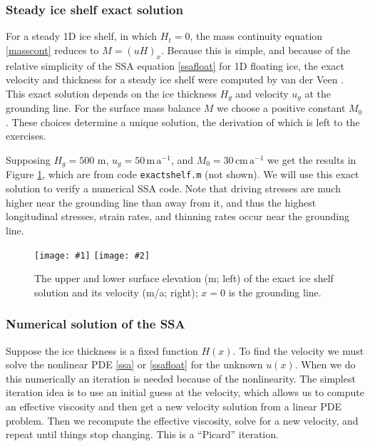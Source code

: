 \documentclass[titlepage,a4paper,final,12pt]{scrartcl}
\newcommand{\twofigsizes}[5]{
\begin{figure}[ht]
\centering
\texttt{[image: \#1]} \quad
\texttt{[image: \#2]}
\caption{#3}
\label{fig:#1}
\end{figure}}
\newcommand{\twofig}[3]{\twofigsizes{#1}{#2}{#3}{2.5in}{2.5in}}
\begin{document}
\subsubsection*{Steady ice shelf exact solution}  For a steady 1D ice shelf, in which $H_t=0$, the mass continuity equation \eqref{masscont} reduces to $M=(uH)_x$.  Because this is simple, and because of the relative simplicity of the SSA equation \eqref{ssafloat} for 1D floating ice, the exact velocity and thickness for a steady ice shelf were computed by van der Veen  \cite{vanderVeen83}.  This exact solution depends on the ice thickness $H_g$ and velocity $u_g$ at the grounding line.  For the surface mass balance $M$ we choose a positive constant $M_0$.  These choices determine a unique solution, the derivation of which is left to the exercises.

Supposing $H_g=500$ m, $u_g = 50 \,\text{m}\,\text{a}^{-1}$, and $M_0=30 \,\text{cm}\,\text{a}^{-1}$ we get the results in Figure \ref{fig:steadyshelfprofile}, which are from code \texttt{exactshelf.m} (not shown).  We will use this exact solution to verify a numerical SSA code.  Note that driving stresses are much higher near the grounding line than away from it, and thus the highest longitudinal stresses, strain rates, and thinning rates occur near the grounding line.

\twofig{steadyshelfprofile}{steadyshelfvelocity}{The upper and lower surface elevation (m; left) of the exact ice shelf solution and its velocity (m/a; right); $x=0$ is the grounding line.}

\subsubsection*{Numerical solution of the SSA}  Suppose the ice thickness is a fixed function $H(x)$.  To find the velocity we must solve the nonlinear PDE \eqref{ssa} or \eqref{ssafloat} for the unknown $u(x)$.  When we do this numerically an iteration is needed because of the nonlinearity.  The simplest iteration idea is to use an initial guess at the velocity, which allows us to compute an effective viscosity and then get a new velocity solution from a linear PDE problem.  Then we recompute the effective viscosity, solve for a new velocity, and repeat until things stop changing.  This is a ``Picard'' iteration.
\end{document}
